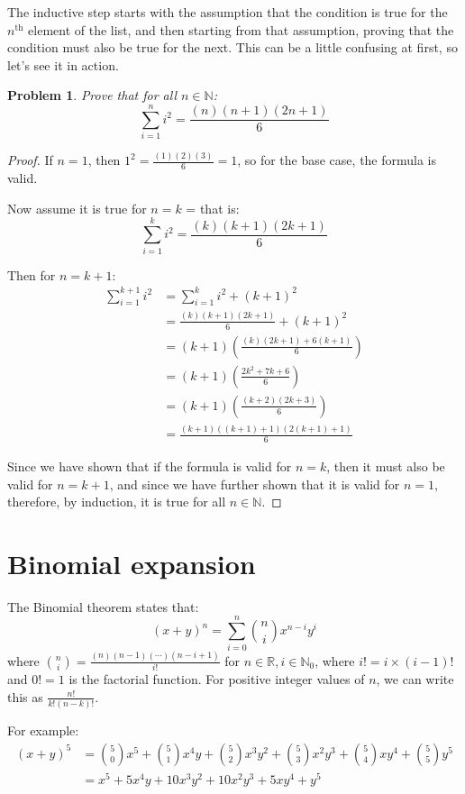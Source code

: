 \documentclass{article}
\newtheorem*{problem}{Problem}
\begin{document}
The inductive step starts with the assumption that the condition is true for the
$n^\text{th}$ element of the list, and then starting from that assumption, proving
that the condition must also be true for the next. This can be a little confusing at
first, so let's see it in action.

\begin{problem} Prove that for all $n \in \mathbb{N}$:
	\[ \sum_{i=1}^{n} i^2 = \frac{(n)(n+1)(2n+1)}{6} \]
\end{problem}

\begin{proof}
	If $n = 1$, then $1^2 = \frac{(1)(2)(3)}{6} = 1$, so for the base case, the formula is valid.

	Now assume it is true for $n=k$ = that is:
	\[ \sum_{i=1}^{k} i^2 = \frac{(k)(k+1)(2k+1)}{6} \]

	Then for $n=k+1$:
	\begin{align*}
		\sum_{i=1}^{k+1} i^2 &= \sum_{i=1}^{k} i^2 + (k+1)^2 \\
		 &= \frac{(k)(k+1)(2k+1)}{6} + (k+1)^2 \\
		 &= \left(k+1\right)\left(\frac{(k)(2k+1) + 6(k+1)}{6}\right) \\
		 &= \left(k+1\right)\left(\frac{2k^2 +7k +6}{6}\right) \\
		 &= \left(k+1\right)\left(\frac{(k+2)(2k+3)}{6}\right) \\
		 &= \frac{(k+1)((k+1)+1)(2(k+1)+1)}{6}
	\end{align*}
	
	Since we have shown that if the formula is valid for $n=k$, then it must also
	be valid for $n=k+1$, and since we have further shown that it is valid for $n=1$,
	therefore, by induction, it is true for all $n \in \mathbb{N}$.
\end{proof}

\section{Binomial expansion}

The Binomial theorem states that:
\[ (x + y)^n = \sum_{i=0}^{n} \binom{n}{i}x^{n-i}y^{i} \]
where $\binom{n}{i} = \frac{(n)(n-1)(\cdots)(n-i+1)}{i!}$ for 
$n \in \mathbb{R}, i \in \mathbb{N}_0$, where $i! = i\times(i-1)!$ and $0!=1$ is the
factorial function. For positive integer values of $n$, we can write this as $\frac{n!}{k!(n-k)!}$.

For example:
\begin{align*}
	(x+y)^5 &= \binom{5}{0}x^5 + \binom{5}{1}x^4y + \binom{5}{2}x^3y^2 + 
	\binom{5}{3}x^2y^3 + \binom{5}{4}xy^4 + \binom{5}{5}y^5 \\
	 &= x^5 + 5x^4y + 10x^3y^2 + 10x^2y^3 + 5xy^4 + y^5
\end{align*}
\end{document}
